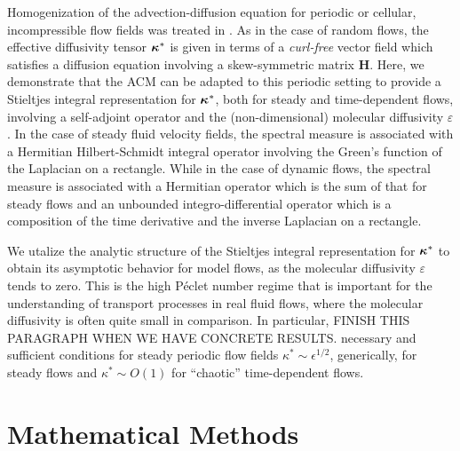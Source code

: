 \documentclass[11pt]{amsart}
\newcommand{\Hb}{\mathbf{H}}
\newcommand\bkappa{\mbox{\boldmath${\kappa}$}}
\begin{document}
Homogenization of the advection-diffusion equation for periodic or
cellular, incompressible flow fields was treated in
\cite{Fannjiang:SIAM_JAM:333,Fannjiang:1997:1033}. As in the case of
random flows, the effective diffusivity tensor
$\bkappa^*$ is given in terms of a \emph{curl-free} vector field which
satisfies a diffusion equation involving a skew-symmetric
matrix $\Hb$. Here, we demonstrate that the ACM can
be adapted to this periodic setting to provide a Stieltjes
integral representation for $\bkappa^*$, both for steady and
time-dependent flows, involving a self-adjoint operator and the
(non-dimensional) molecular diffusivity $\varepsilon$. In the case of steady
fluid velocity fields, the spectral measure is associated with a
Hermitian Hilbert-Schmidt integral operator involving the Green's
function of the Laplacian on a rectangle. While in the case of dynamic
flows, the spectral measure is associated with a Hermitian operator
which is the sum of that for steady flows and an unbounded
integro-differential operator which is a composition of the time
derivative and the inverse Laplacian on a rectangle.     
 

We utalize the analytic structure of the Stieltjes integral
representation for $\bkappa^*$ to obtain its asymptotic behavior for
model flows, as the molecular diffusivity $\varepsilon$ tends to zero. This is
the high P\'{e}clet number regime that is important for the
understanding of transport processes in real fluid flows, where the
molecular diffusivity is often quite small in comparison. In
particular, FINISH THIS PARAGRAPH WHEN WE HAVE CONCRETE RESULTS.
necessary and sufficient conditions for steady periodic flow
fields $\kappa^*\sim\epsilon^{1/2}$, generically, for steady flows and $\kappa^*\sim O(1)$ for
``chaotic'' time-dependent flows. 

%
\section{Mathematical Methods}\label{sec:Mathematical_Methods} 
%
\end{document}
